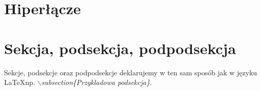 \section{Hiperłącze}

\section{Sekcja, podsekcja, podpodsekcja}
Sekcje, podsekcje oraz podpodsekcje deklarujemy w ten sam sposób jak 
w języku \LaTeX \space np.  \textit{$\backslash$subsection\{Przykladowa podsekcja\}}.


